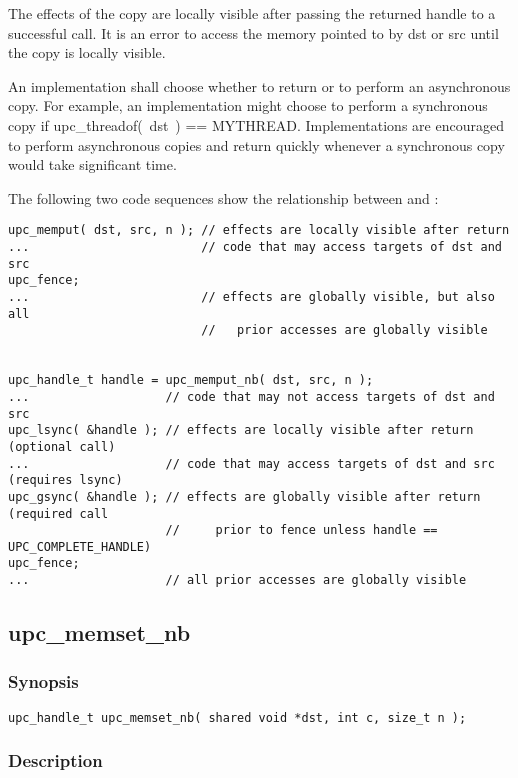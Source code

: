 \np The effects of the copy are locally visible after passing the
returned handle to a successful \lsync{} call.  It is an error to access the
memory pointed to by dst or src until the copy is locally visible.

\np An implementation shall choose whether to return \complete{} or to
perform an asynchronous copy.  For example, an implementation might choose to
perform a synchronous copy if upc\_threadof(~dst~) == MYTHREAD.  Implementations
are encouraged to perform asynchronous copies and return quickly whenever a
synchronous copy would take significant time.

\np The following two code sequences show the relationship between
\memput{} and \function{}:

\begin{verbatim}
upc_memput( dst, src, n ); // effects are locally visible after return
...                        // code that may access targets of dst and src
upc_fence;                 
...                        // effects are globally visible, but also all
                           //   prior accesses are globally visible


upc_handle_t handle = upc_memput_nb( dst, src, n );
...                   // code that may not access targets of dst and src
upc_lsync( &handle ); // effects are locally visible after return (optional call)
...                   // code that may access targets of dst and src (requires lsync)
upc_gsync( &handle ); // effects are globally visible after return (required call
                      //     prior to fence unless handle == UPC_COMPLETE_HANDLE)
upc_fence;
...                   // all prior accesses are globally visible
\end{verbatim}

\newpage
\subsection{upc\_memset\_nb}
\def\function{{\tt upc\_memset\_nb}}

\subsubsection{Synopsis}

\begin{verbatim}
upc_handle_t upc_memset_nb( shared void *dst, int c, size_t n );
\end{verbatim}

\subsubsection{Description}

